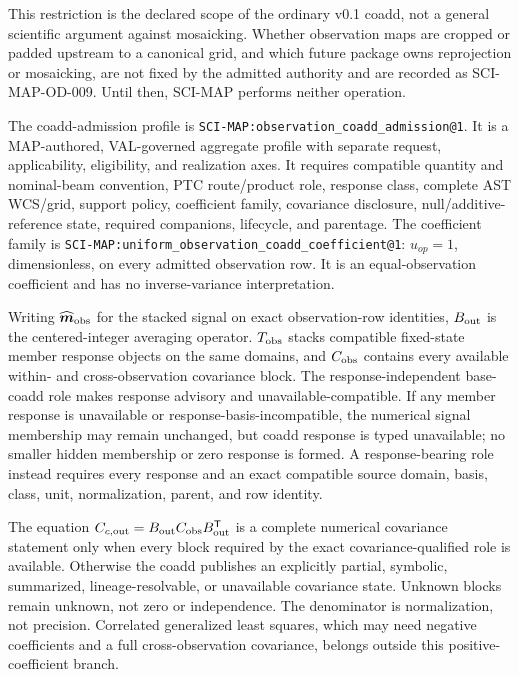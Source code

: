 \documentclass[10pt]{article}
\newcommand{\code}[1]{\nolinkurl{#1}}
\begin{document}
This restriction is the declared scope of the ordinary v0.1 coadd, not a
general scientific argument against mosaicking. Whether observation maps are
cropped or padded upstream to a canonical grid, and which future package owns
reprojection or mosaicking, are not fixed by the admitted authority and are
recorded as SCI-MAP-OD-009. Until then, SCI-MAP performs neither operation.

The coadd-admission profile is
\code{SCI-MAP:observation_coadd_admission@1}. It is a MAP-authored,
VAL-governed aggregate profile with separate request, applicability,
eligibility, and realization axes. It requires compatible quantity
and nominal-beam convention, PTC route/product role, response class, complete
AST WCS/grid, support policy, coefficient family, covariance disclosure,
null/additive-reference state, required companions, lifecycle, and parentage.
The coefficient family is
\code{SCI-MAP:uniform_observation_coadd_coefficient@1}: \(u_{op}=1\),
dimensionless, on every admitted observation row. It is an equal-observation
coefficient and has no inverse-variance interpretation.

Writing \(\widehat{\boldsymbol m}_{\rm obs}\) for the stacked signal on exact
observation-row identities, \(B_{\rm out}\) is the centered-integer averaging
operator. \(T_{\rm obs}\) stacks compatible fixed-state member response objects on the
same domains, and \(C_{\rm obs}\) contains every available within- and
cross-observation covariance block. The response-independent base-coadd role
makes response advisory and unavailable-compatible. If any member response is
unavailable or response-basis-incompatible, the numerical signal membership
may remain unchanged, but coadd response is typed unavailable; no smaller
hidden membership or zero response is formed. A response-bearing role instead
requires every response and an exact compatible source domain, basis, class,
unit, normalization, parent, and row identity.

The equation \(C_{c,{\rm out}}=B_{\rm out}C_{\rm obs}B_{\rm out}^{\mathsf T}\)
is a complete numerical covariance statement only when every block required
by the exact covariance-qualified role is available. Otherwise the coadd
publishes an explicitly partial, symbolic, summarized, lineage-resolvable, or
unavailable covariance state. Unknown blocks remain unknown, not zero or
independence. The denominator is normalization,
not precision. Correlated generalized least squares, which may
need negative coefficients and a full cross-observation covariance, belongs
outside this positive-coefficient branch.
\end{document}

